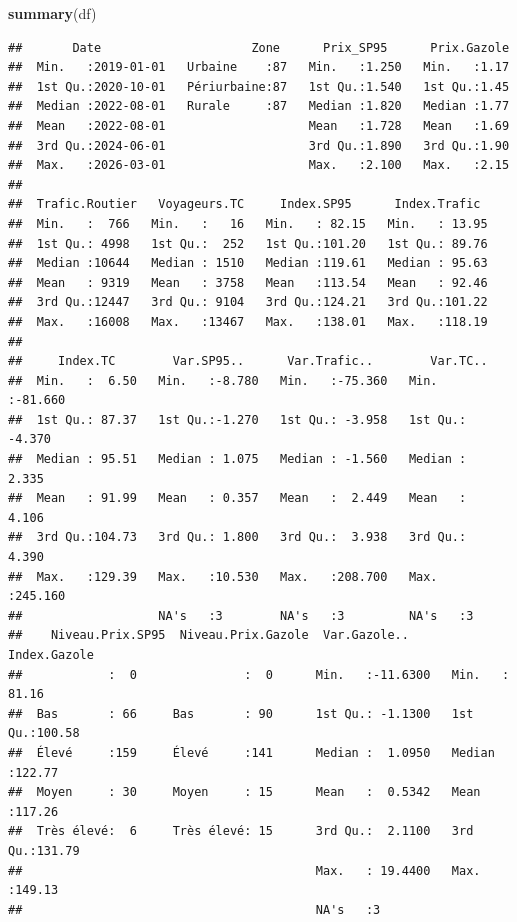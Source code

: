 \documentclass[
]{article}
\newenvironment{Shaded}{\begin{snugshade}}{\end{snugshade}}
\newcommand{\FunctionTok}[1]{\textcolor[rgb]{0.13,0.29,0.53}{\textbf{#1}}}
\newcommand{\NormalTok}[1]{#1}
\begin{document}
\begin{Shaded}
\begin{Highlighting}[]
\FunctionTok{summary}\NormalTok{(df)}
\end{Highlighting}
\end{Shaded}

\begin{verbatim}
##       Date                     Zone      Prix_SP95      Prix.Gazole  
##  Min.   :2019-01-01   Urbaine    :87   Min.   :1.250   Min.   :1.17  
##  1st Qu.:2020-10-01   Périurbaine:87   1st Qu.:1.540   1st Qu.:1.45  
##  Median :2022-08-01   Rurale     :87   Median :1.820   Median :1.77  
##  Mean   :2022-08-01                    Mean   :1.728   Mean   :1.69  
##  3rd Qu.:2024-06-01                    3rd Qu.:1.890   3rd Qu.:1.90  
##  Max.   :2026-03-01                    Max.   :2.100   Max.   :2.15  
##                                                                      
##  Trafic.Routier   Voyageurs.TC     Index.SP95      Index.Trafic   
##  Min.   :  766   Min.   :   16   Min.   : 82.15   Min.   : 13.95  
##  1st Qu.: 4998   1st Qu.:  252   1st Qu.:101.20   1st Qu.: 89.76  
##  Median :10644   Median : 1510   Median :119.61   Median : 95.63  
##  Mean   : 9319   Mean   : 3758   Mean   :113.54   Mean   : 92.46  
##  3rd Qu.:12447   3rd Qu.: 9104   3rd Qu.:124.21   3rd Qu.:101.22  
##  Max.   :16008   Max.   :13467   Max.   :138.01   Max.   :118.19  
##                                                                   
##     Index.TC        Var.SP95..      Var.Trafic..        Var.TC..      
##  Min.   :  6.50   Min.   :-8.780   Min.   :-75.360   Min.   :-81.660  
##  1st Qu.: 87.37   1st Qu.:-1.270   1st Qu.: -3.958   1st Qu.: -4.370  
##  Median : 95.51   Median : 1.075   Median : -1.560   Median :  2.335  
##  Mean   : 91.99   Mean   : 0.357   Mean   :  2.449   Mean   :  4.106  
##  3rd Qu.:104.73   3rd Qu.: 1.800   3rd Qu.:  3.938   3rd Qu.:  4.390  
##  Max.   :129.39   Max.   :10.530   Max.   :208.700   Max.   :245.160  
##                   NA's   :3        NA's   :3         NA's   :3        
##    Niveau.Prix.SP95  Niveau.Prix.Gazole  Var.Gazole..       Index.Gazole   
##            :  0               :  0      Min.   :-11.6300   Min.   : 81.16  
##  Bas       : 66     Bas       : 90      1st Qu.: -1.1300   1st Qu.:100.58  
##  Élevé     :159     Élevé     :141      Median :  1.0950   Median :122.77  
##  Moyen     : 30     Moyen     : 15      Mean   :  0.5342   Mean   :117.26  
##  Très élevé:  6     Très élevé: 15      3rd Qu.:  2.1100   3rd Qu.:131.79  
##                                         Max.   : 19.4400   Max.   :149.13  
##                                         NA's   :3
\end{verbatim}
\end{document}
